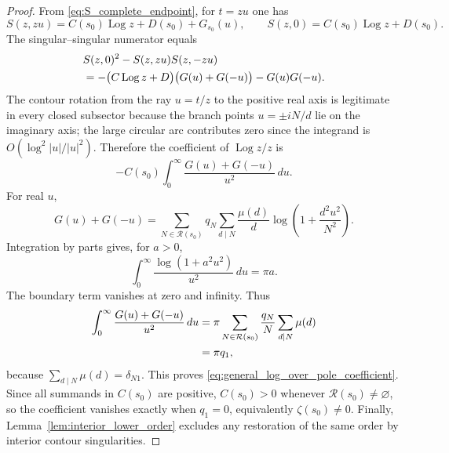 \documentclass[11pt]{amsart}
\numberwithin{equation}{section}
\theoremstyle{plain}
\theoremstyle{definition}
\theoremstyle{remark}
\newcommand{\Log}{\operatorname{Log}}
\begin{document}
\begin{proof}
From \eqref{eq:S_complete_endpoint}, for \(t=zu\) one has
\begin{equation}
S(z,zu)=C(s_0)\Log z+D(s_0)+G_{s_0}(u),
\qquad
S(z,0)=C(s_0)\Log z+D(s_0).
\label{eq:S_scaled_general}
\end{equation}
The singular--singular numerator equals
\begin{align}
&S(z,0)^2-S(z,zu)S(z,-zu)
\notag\\
&= -\bigl(C\Log z+D\bigr)
\bigl(G(u)+G(-u)\bigr)-G(u)G(-u).
\label{eq:SS_scaled_numerator}
\end{align}
The contour rotation from the ray \(u=t/z\) to the positive real axis is
legitimate in every closed subsector because the branch points
\(u=\pm iN/d\) lie on the imaginary axis; the large circular arc contributes
zero since the integrand is \(O(\log^2|u|/|u|^2)\).  Therefore the
coefficient of \(\Log z/z\) is
\begin{equation}
-C(s_0)
\int_0^\infty\frac{G(u)+G(-u)}{u^2}\,du.
\label{eq:alpha_integral_general}
\end{equation}
For real \(u\),
\begin{equation}
G(u)+G(-u)
=
\sum_{N\in\mathcal R(s_0)}q_N
\sum_{d\mid N}\frac{\mu(d)}d
\log\left(1+\frac{d^2u^2}{N^2}\right).
\label{eq:G_plus_Gminus}
\end{equation}
Integration by parts gives, for \(a>0\),
\begin{equation}
\int_0^\infty\frac{\log(1+a^2u^2)}{u^2}\,du=\pi a.
\label{eq:log_quadratic_integral}
\end{equation}
The boundary term vanishes at zero and infinity.  Thus
\begin{align}
\int_0^\infty\frac{G(u)+G(-u)}{u^2}\,du
&=
\pi\sum_{N\in\mathcal R(s_0)}\frac{q_N}{N}
\sum_{d\mid N}\mu(d)
\notag\\
&=\pi q_1,
\label{eq:G_sum_mobius_collapse}
\end{align}
because \(\sum_{d\mid N}\mu(d)=\delta_{N1}\).  This proves
\eqref{eq:general_log_over_pole_coefficient}.  Since all summands in
\(C(s_0)\) are positive, \(C(s_0)>0\) whenever
\(\mathcal R(s_0)\ne\varnothing\), so the coefficient vanishes exactly when
\(q_1=0\), equivalently \(\zeta(s_0)\ne0\).  Finally,
Lemma~\ref{lem:interior_lower_order} excludes any restoration of the same
order by interior contour singularities.
\end{proof}
\end{document}
